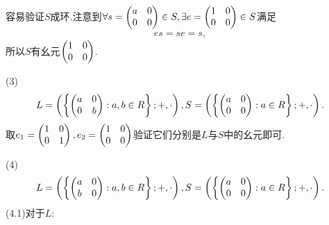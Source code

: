 \begin{solution}
    容易验证$S$成环.注意到$\forall s=\left(\begin{matrix}
        a&0\\
        0&0
    \end{matrix}\right)\in S,\exists e=\left(\begin{matrix}
        1&0\\
        0&0
    \end{matrix}\right)\in S$满足\begin{align*}
        es=se=s,
    \end{align*}所以$S$有幺元$\left(\begin{matrix}
        1&0\\
        0&0
    \end{matrix}\right)$.

    (3)\begin{align*}
        L=\left(\left\{\left(\begin{matrix}
            a&0\\
            0&b
        \end{matrix}\right):a,b\in\relax{R}\right\};+,\cdot\right),S=\left(\left\{\left(\begin{matrix}
            a&0\\
            0&0
        \end{matrix}\right):a\in\relax{R}\right\};+,\cdot\right).
    \end{align*}取$e_1=\left(\begin{matrix}
        1&0\\
        0&1
    \end{matrix}\right),e_2=\left(\begin{matrix}
        1&0\\
        0&0
    \end{matrix}\right)$验证它们分别是$L$与$S$中的幺元即可.

    (4)\begin{align*}
        L=\left(\left\{\left(\begin{matrix}
            a&0\\
            b&0
        \end{matrix}\right):a,b\in\relax{R}\right\};+,\cdot\right),S=\left(\left\{\left(\begin{matrix}
            a&0\\
            0&0
        \end{matrix}\right):a\in\relax{R}\right\};+,\cdot\right).
    \end{align*}(4.1)对于$L$:
    

\end{solution}
